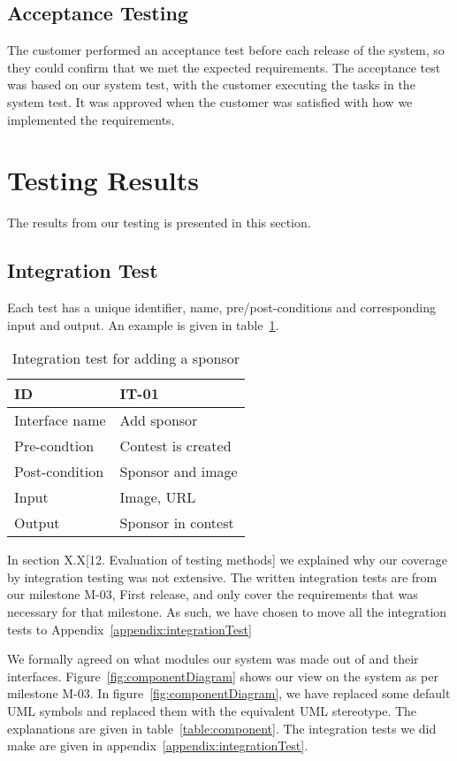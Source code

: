 \subsection{Acceptance Testing}
The customer performed an acceptance test before each release of the
system, so they could confirm that we met the expected requirements.
The acceptance test was based on our system test, with the customer
executing the tasks in the system test. It was
approved when the customer was satisfied with how we implemented the
requirements.

\pagebreak
\section{Testing Results}
The results from our testing is presented in this section.

\subsection{Integration Test}
Each test has a unique identifier, name, pre/post-conditions and corresponding
input and output. An example is given in table~\ref{table:integrationTest}.

\begin{longtable}{|l|l|}
    \caption{Integration test for adding a sponsor} \label{table:integrationTest}\\
\hline
ID & IT-01\\\hline
Interface name & Add sponsor\\\hline
Pre-condtion & Contest is created\\\hline
Post-condition & Sponsor and image\\\hline
Input & Image, URL\\\hline
Output & Sponsor in contest\\\hline
\end{longtable}

In section X.X[12. Evaluation of testing methods] we explained why our
coverage by integration testing was not extensive. The written
integration tests are from our milestone M-03, First release, and only cover the
requirements that was necessary for that milestone. As such, we have
chosen to move all the integration tests to Appendix~\ref{appendix:integrationTest}

We formally agreed on what modules our system was made out of and their
interfaces. Figure~\ref{fig:componentDiagram} shows our view on the system as
per milestone M-03. In figure~\ref{fig:componentDiagram}, we have replaced
some default UML symbols and replaced them with the equivalent UML stereotype.
The explanations are given in table~\ref{table:component}. The integration
tests we did make are given in appendix~\ref{appendix:integrationTest}.

